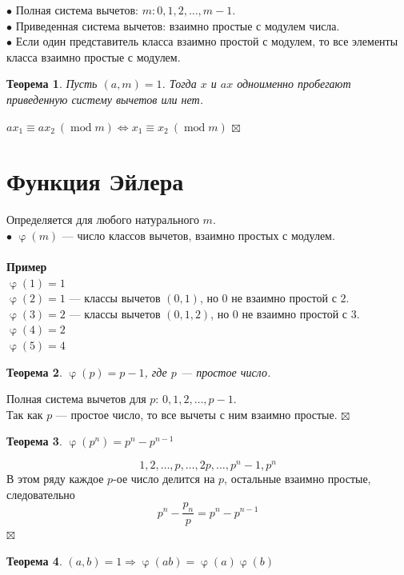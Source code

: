 \documentclass[a4paper, 12pt]{article}
\newtheorem*{theorem}{Теорема}
\newenvironment{Proof}
{\par\noindent{$\blacklozenge$}}
{\hfill$\scriptstyle\boxtimes$}
\renewcommand{\mod}{\operatorname{mod}}
\renewcommand{\varphi}{\upvarphi}
\begin{document}
    $\bullet$ Полная система вычетов: $m: 0,1,2, \dots, m-1$.\\
    $\bullet$ Приведенная система вычетов: взаимно простые с модулем числа.\\
    $\bullet$ Если один представитель класса взаимно простой с модулем, то все элементы класса взаимно простые с модулем.
    \begin{theorem}
        Пусть $(a,m)=1$. Тогда $x$ и $ax$ одноименно пробегают приведенную систему вычетов или нет.
    \end{theorem}
    \begin{Proof}
    $ax_1 \equiv ax_2 \ (\mod m) \Leftrightarrow x_1 \equiv x_2 \ (\mod m)$
    \end{Proof}
    \section{Функция Эйлера}
    Определяется для любого натурального $m$.\\
    $\bullet$ $\varphi(m)$ --- число классов вычетов, взаимно простых с модулем.\\\\
    \textbf{Пример}\\
    $\varphi(1)=1$\\
    $\varphi(2)=1$ --- классы вычетов $(0,1)$, но $0$ не взаимно простой с $2$.\\
    $\varphi(3) = 2$  --- классы вычетов $(0,1,2)$, но $0$ не взаимно простой с $3$.\\
    $\varphi(4) = 2$\\
    $\varphi(5) = 4$
    \begin{theorem}
        $\varphi(p)=p-1$, где $p$ --- простое число.
    \end{theorem}
    \begin{Proof}
    Полная система вычетов для $p$: $0,1,2,\dots,p-1$.\\
    Так как $p$ --- простое число, то все вычеты с ним взаимно простые.
    \end{Proof}
    \begin{theorem}
        $\varphi(p^n)=p^n-p^{n-1}$
    \end{theorem}
    \begin{Proof}
    $$1,2,\dots,p,\dots,2p,\dots,p^n-1,p^n$$
    В этом ряду каждое $p$-ое число делится на $p$, остальные взаимно простые, следовательно
    $$p^n-\dfrac{p_n}{p}=p^n-p^{n-1}$$
    \end{Proof}
    \begin{theorem}
        $(a,b)=1 \Rightarrow \varphi(ab)=\varphi(a)\varphi(b)$
    \end{theorem}
\end{document}
